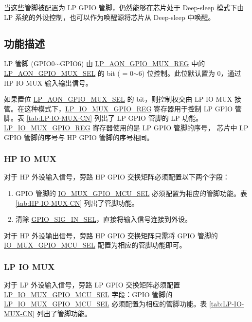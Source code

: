 \documentclass[main\_\_CN.tex]{subfiles}
\begin{document}
当这些管脚被配置为 LP GPIO 管脚，仍然能够在芯片处于 Deep-sleep 模式下由 LP 系统的外设控制，也可以作为唤醒源将芯片从 Deep-sleep 中唤醒。

\subsection{功能描述}

LP 管脚 (GPIO0$\sim$GPIO6) 由 \hyperref[regdesc:LPAONGPIOMUXREG]{LP\_AON\_GPIO\_MUX\_REG} 中的 \hyperref[fielddesc:LPAONGPIOMUXSEL]{LP\_AON\_GPIO\_MUX\_SEL} 的 bit\regindex{[n]} ( = 0$\sim$6) 位控制。此位默认置为 0，通过 HP IO MUX 输入输出信号。

如果置位 \hyperref[fielddesc:LPAONGPIOMUXSEL]{LP\_AON\_GPIO\_MUX\_SEL} 的 bit\regindex{[n]}，则控制权交由 LP IO MUX 接管。在这种模式下，\hyperref[regdesc:LPIOMUXGPIONREG]{LP\_IO\_MUX\_GPIO\_REG} 寄存器用于控制 LP GPIO 管脚。表 \ref{tab:LP-IO-MUX-CN} 列出了 LP GPIO 管脚的 LP 功能。\hyperref[regdesc:LPIOMUXGPIONREG]{LP\_IO\_MUX\_GPIO\_REG} 寄存器使用的是 LP GPIO 管脚的序号，\chipname{} 芯片中 LP GPIO 管脚的序号与 HP GPIO 管脚的序号相同。

\subsubsection{HP IO MUX}
对于 HP 外设输入信号，旁路 HP GPIO 交换矩阵必须配置以下两个字段：

\begin{enumerate}
\item GPIO 管脚的 \hyperref[fielddesc:IOMUXGPIONMCUSEL]{IO\_MUX\_GPIO\_MCU\_SEL} 必须配置为相应的管脚功能。表 \ref{tab:HP-IO-MUX-CN} 列出了管脚功能。
\item 清除 \hyperref[fielddesc:GPIOSIGNINSEL]{GPIO\_SIG\_IN\_SEL}，直接将输入信号连接到外设。
\end{enumerate}

对于 HP 外设输出信号，旁路 HP GPIO 交换矩阵只需将 GPIO 管脚的 \hyperref[fielddesc:IOMUXGPIONMCUSEL]{IO\_MUX\_GPIO\_MCU\_SEL} 配置为相应的管脚功能即可。

\subsubsection{LP IO MUX}
对于 LP 外设输入信号，旁路 LP GPIO 交换矩阵必须配置 \hyperref[fielddesc:LPIOMUXGPIONMCUSEL] {LP\_IO\_MUX\_GPIO\_MCU\_SEL} 字段：GPIO 管脚的 \hyperref[fielddesc:LPIOMUXGPIONMCUSEL] {LP\_IO\_MUX\_GPIO\_MCU\_SEL} 必须配置为相应的管脚功能。表 \ref{tab:LP-IO-MUX-CN} 列出了管脚功能。
\end{document}
